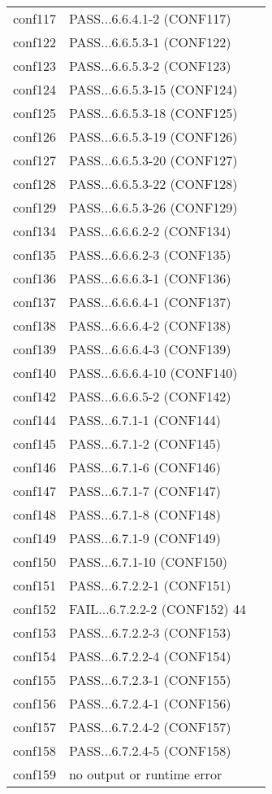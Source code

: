 \begin{tabular}{llc}
  conf117& PASS...6.6.4.1-2 (CONF117)&\\
  conf122& PASS...6.6.5.3-1 (CONF122)&\\
  conf123& PASS...6.6.5.3-2 (CONF123)&\\
  conf124& PASS...6.6.5.3-15 (CONF124)&\\
  conf125& PASS...6.6.5.3-18 (CONF125)&\\
  conf126& PASS...6.6.5.3-19 (CONF126)&\\
  conf127& PASS...6.6.5.3-20 (CONF127)&\\
  conf128& PASS...6.6.5.3-22 (CONF128)&\\
  conf129& PASS...6.6.5.3-26 (CONF129)&\\
  conf134& PASS...6.6.6.2-2 (CONF134)&\\
  conf135& PASS...6.6.6.2-3 (CONF135)&\\
  conf136& PASS...6.6.6.3-1 (CONF136)&\\
  conf137& PASS...6.6.6.4-1 (CONF137)&\\
  conf138& PASS...6.6.6.4-2 (CONF138)&\\
  conf139& PASS...6.6.6.4-3 (CONF139)&\\
  conf140& PASS...6.6.6.4-10 (CONF140)&\\
  conf142& PASS...6.6.6.5-2 (CONF142)&\\
  conf144& PASS...6.7.1-1 (CONF144)&\\
  conf145& PASS...6.7.1-2 (CONF145)&\\
  conf146& PASS...6.7.1-6 (CONF146)&\\
  conf147& PASS...6.7.1-7 (CONF147)&\\
  conf148& PASS...6.7.1-8 (CONF148)&\\
  conf149& PASS...6.7.1-9 (CONF149)&\\
  conf150& PASS...6.7.1-10 (CONF150)&\\
  conf151& PASS...6.7.2.2-1 (CONF151)&\\
  conf152& FAIL...6.7.2.2-2 (CONF152)          44&\\
  conf153& PASS...6.7.2.2-3 (CONF153)&\\
  conf154& PASS...6.7.2.2-4 (CONF154)&\\
  conf155& PASS...6.7.2.3-1 (CONF155)&\\
  conf156& PASS...6.7.2.4-1 (CONF156)&\\
  conf157& PASS...6.7.2.4-2 (CONF157)&\\
  conf158& PASS...6.7.2.4-5 (CONF158)&\\
  conf159& no output or runtime error &\\

\end{tabular}
